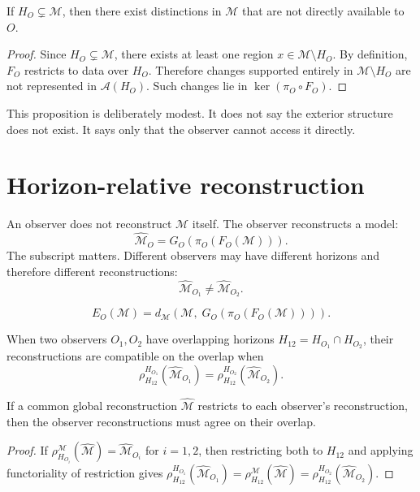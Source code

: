 \begin{proposition}
  If $H_O \subsetneq \mathcal{M}$, then there exist distinctions
  in $\mathcal{M}$ that are not directly available to $O$.
\end{proposition}

\begin{proof}
  Since $H_O \subsetneq \mathcal{M}$, there exists at least one
  region $x \in \mathcal{M} \setminus H_O$.
  By definition, $F_O$ restricts to data over $H_O$.
  Therefore changes supported entirely in
  $\mathcal{M} \setminus H_O$ are not represented in
  $\mathcal{A}(H_O)$.
  Such changes lie in $\ker(\pi_O \circ F_O)$.
\end{proof}

This proposition is deliberately modest.
It does not say the exterior structure does not exist.
It says only that the observer cannot access it directly.

\section{Horizon-relative reconstruction}

An observer does not reconstruct $\mathcal{M}$ itself.
The observer reconstructs a model:
\[
  \widehat{\mathcal{M}}_O
  = G_O(\pi_O(F_O(\mathcal{M}))).
\]
The subscript matters.
Different observers may have different horizons and therefore
different reconstructions:
\[
  \widehat{\mathcal{M}}_{O_1} \neq \widehat{\mathcal{M}}_{O_2}.
\]

\begin{definition}
  \[
    E_O(\mathcal{M})
    = d_{\mathcal{M}}\!\left(
        \mathcal{M},\;
        G_O(\pi_O(F_O(\mathcal{M})))
      \right).
  \]
\end{definition}

When two observers $O_1, O_2$ have overlapping horizons
$H_{12} = H_{O_1} \cap H_{O_2}$, their reconstructions are
compatible on the overlap when
\[
  \rho^{H_{O_1}}_{H_{12}}\!\left(\widehat{\mathcal{M}}_{O_1}\right)
  = \rho^{H_{O_2}}_{H_{12}}\!\left(\widehat{\mathcal{M}}_{O_2}\right).
\]

\begin{proposition}
  If a common global reconstruction $\widehat{\mathcal{M}}$
  restricts to each observer's reconstruction, then the
  observer reconstructions must agree on their overlap.
\end{proposition}

\begin{proof}
  If $\rho^{\mathcal{M}}_{H_{O_i}}(\widehat{\mathcal{M}})
  = \widehat{\mathcal{M}}_{O_i}$ for $i = 1, 2$, then
  restricting both to $H_{12}$ and applying functoriality of
  restriction gives
  $\rho^{H_{O_1}}_{H_{12}}(\widehat{\mathcal{M}}_{O_1})
  = \rho^{\mathcal{M}}_{H_{12}}(\widehat{\mathcal{M}})
  = \rho^{H_{O_2}}_{H_{12}}(\widehat{\mathcal{M}}_{O_2})$.
\end{proof}

